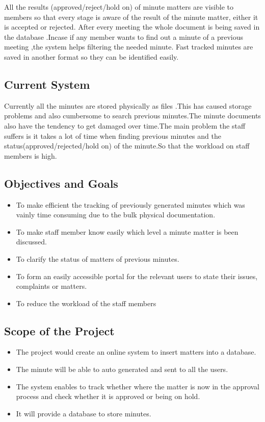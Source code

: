 \documentclass[a4paper,beamer]{article}
\begin{document}
	All the results (approved/reject/hold on) of minute matters are visible to members so that every stage is aware of the result of the minute matter, either it is accepted or rejected.\newline
	After every meeting the whole document is being saved in the database .Incase if any member wants to find  out a minute of a previous meeting ,the system helps filtering the needed minute.\newline
	Fast tracked minutes are saved in another format so  they can be identified easily.\newline
	
	\subsection{Current System}
	Currently all the minutes are stored physically as files .This has caused  storage problems and also cumbersome to search previous minutes.The minute documents also have the  tendency to get damaged over time.The main problem the staff suffers is it takes a lot of time when finding previous minutes and the status(approved/rejected/hold on) of the minute.So that the workload on staff members is high.
	
	\subsection{Objectives and Goals}
	\begin{itemize}
		\item To make efficient the tracking of previously generated minutes which was vainly time consuming due to the bulk physical documentation.
		\item To make staff member know easily  which level a minute matter is been discussed.
		\item To clarify the status of matters of previous minutes.
		\item To form an easily accessible portal for the relevant users to state their issues, complaints or matters.
		\item To reduce the workload of the staff members 
	\end{itemize}
	
	\subsection{Scope of the Project}
	\begin{itemize}
		\item The project would create an online system to insert matters into a database.
		\item The minute will be able to auto generated and sent to all the users.
		\item The system enables to track whether where the matter is now in the approval process and check whether it is approved or being on hold.
		\item It will provide a database to store minutes.
	\end{itemize}
	
\end{document}
